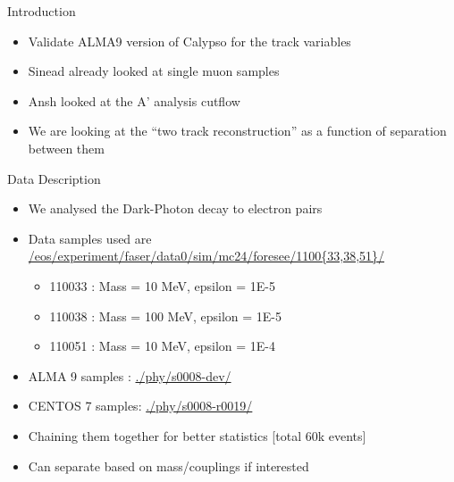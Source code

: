 \begin{frame}{Introduction}
    \begin{itemize}
        \item Validate ALMA9 version of Calypso for the track variables
        \item Sinead already looked at single muon samples
        \item Ansh looked at the A' analysis cutflow
        \item We are looking at the ``two track reconstruction'' as a function of separation between them
    \end{itemize}
\end{frame}

\begin{frame}{Data Description}
    \begin{itemize}
        \item We analysed the Dark-Photon decay to electron pairs
        \item Data samples used are \href{/eos/experiment/faser/data0/sim/mc24/foresee/1100*/phy/}{\small /eos/experiment/faser/data0/sim/mc24/foresee/1100\{33,38,51\}/}
        \begin{itemize}
            \item 110033 : Mass = 10  MeV, epsilon = 1E-5 
            \item 110038 : Mass = 100 MeV, epsilon = 1E-5 
            \item 110051 : Mass = 10  MeV, epsilon = 1E-4 
        \end{itemize}
        \item ALMA 9 samples : \href{./phy/s0008-dev/}{./phy/s0008-dev/} 
        \item CENTOS 7 samples: \href{./phy/s0008-r0019/}{./phy/s0008-r0019/}
        \item Chaining them together  for better statistics [total 60k events]
        \item Can separate based on mass/couplings if interested
    \end{itemize}
    
\end{frame}

